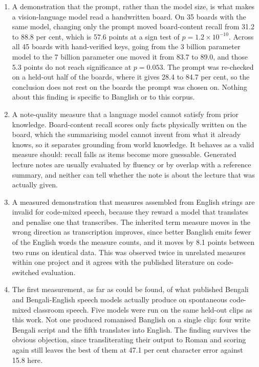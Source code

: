 \begin{enumerate}
  \item A demonstration that the prompt, rather than the model size, is what makes a
        vision-language model read a handwritten board. On 35 boards with the same model,
        changing only the prompt moved board-content recall from 31.2 to 88.8 per cent,
        which is 57.6 points at a sign test of $p = 1.2 \times 10^{-10}$. Across all 45
        boards with hand-verified keys, going from the 3 billion parameter model to the
        7 billion parameter one moved it from 83.7 to 89.0, and those 5.3 points do not
        reach significance at $p = 0.053$. The prompt was re-checked on a held-out
        half of the boards, where it gives 28.4 to 84.7 per cent, so the conclusion does
        not rest on the boards the prompt was chosen on. Nothing about this finding is
        specific to Banglish or to this corpus.

  \item A note-quality measure that a language model cannot satisfy from prior knowledge.
        Board-content recall scores only facts physically written on the board, which the
        summarising model cannot invent from what it already knows, so it separates
        grounding from world knowledge. It behaves as a valid measure should: recall falls
        as items become more guessable. Generated lecture notes are usually evaluated by
        fluency or by overlap with a reference summary, and neither can tell whether the
        note is about the lecture that was actually given.

  \item A measured demonstration that measures assembled from English strings are invalid
        for code-mixed speech, because they reward a model that translates and penalise
        one that transcribes. The inherited term measure moves in the wrong direction as
        transcription improves, since better Banglish emits fewer of the English words the
        measure counts, and it moves by 8.1 points between two runs on identical data.
        This was observed twice in unrelated measures within one project and it agrees
        with the published literature on code-switched evaluation.

  \item The first measurement, as far as could be found, of what published Bengali and
        Bengali-English speech models actually produce on spontaneous code-mixed classroom
        speech. Five models were run on the same held-out clips as this work. Not one
        produced romanised Banglish on a single clip: four write Bengali script and the
        fifth translates into English. The finding survives the obvious objection, since
        transliterating their output to Roman and scoring again still leaves the best of
        them at 47.1 per cent character error against 15.8 here.


\end{enumerate}
